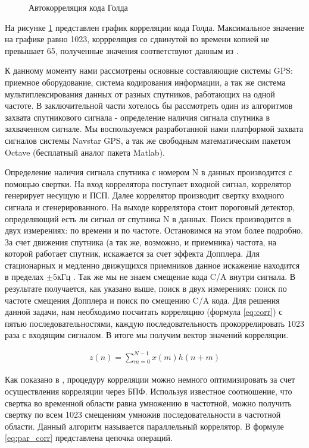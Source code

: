 \documentclass[a4paper,12pt]{article}
\numberwithin{table}{section}
\begin{document}
\begin{figure}[h]
\begin{center}
\end{center}
\caption{Автокорреляция кода Голда}
\label{pic:gold}
\end{figure}
На рисунке \ref{pic:gold} представлен график корреляции кода Голда. Максимальное значение на графике равно 1023, коррреляция 
со сдвинутой во времени копией не превышает 65, полученные значения соответствуют данным из \cite{gold-ieee}.

К данному моменту нами рассмотрены основные составляющие системы GPS: приемное оборудование, система кодирования информации,
а так же система мультиплексирования данных от разных спутников, работающих на одной частоте. В заключительной части хотелось
бы рассмотреть один из алгоритмов захвата спутникового сигнала - определение наличия сигнала спутника 
в захваченном сигнале. Мы воспользуемся разработанной нами платформой захвата сигналов системы Navstar GPS, а так же
свободным математическим пакетом Octave (бесплатный аналог пакета Matlab).

Определение наличия сигнала спутника с номером N в данных производится с помощью свертки. На вход коррелятора поступает входной
сигнал, коррелятор генерирует несущую и ПСП. Далее коррелятор производит свертку входного сигнала и сгенерированного. 
На выходе коррелятора стоит пороговый детектор, определяющий есть ли сигнал от спутника N в данных. Поиск производится в 
двух измерениях: по времени и по частоте. Остановимся на этом более подробно. За счет движения спутника (а так же, возможно,
и приемника) частота, на которой работает спутник, искажается за счет эффекта Допплера. Для стационарных и медленно движущихся
приемников данное искажение находится в  пределах ${\pm{5 \mbox{кГц}}}$ \cite{tsui}. Так же мы не знаем смещение кода C/A
внутри сигнала. В результате получается, как указано выше, поиск в двух измерениях: поиск по частоте смещения Допплера и
поиск по смещению C/A кода. Для решения данной задачи, нам необходимо посчитать корреляцию (формула \ref{eq:corr}) с пятью последовательностями,
каждую последовательность прокоррелировать 1023 раза с входящим сигналом. В итоге мы получим вектор значений корреляции.

\begin{eqnarray}
	z(n) = \sum_{m=0}^{N-1}{x(m)h(n+m)}
\label{eq:corr}
\end{eqnarray}

Как показано в \cite{book_oppenheim, tsui}, процедуру корреляции можно немного оптимизировать за счет осуществления корреляции через
БПФ. Используя известное соотношение, что свертка во временной области равна умножению в частотной, можно получить свертку по
всем 1023 смещениям умножив последовательности в частотной области. Данный алгоритм называется параллельный коррелятор.
В формуле \ref{eq:par_corr} представлена цепочка операций.
\end{document}
